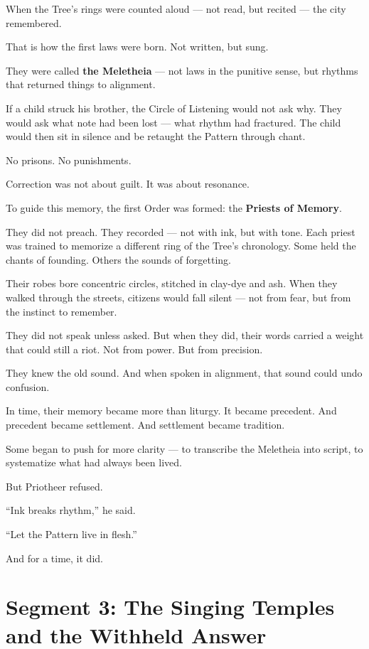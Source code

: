 \documentclass[10pt]{article}
\begin{document}
When the Tree’s rings were counted aloud — not read, but recited —  
the city remembered.

That is how the first laws were born.  
Not written, but sung.

They were called \textbf{the Meletheia} — not laws in the punitive sense,  
but rhythms that returned things to alignment.

If a child struck his brother, the Circle of Listening would not ask why.  
They would ask what note had been lost — what rhythm had fractured.  
The child would then sit in silence and be retaught the Pattern through chant.

No prisons.  
No punishments.

Correction was not about guilt.  
It was about resonance.

To guide this memory, the first Order was formed:  
the \textbf{Priests of Memory}.

They did not preach.  
They recorded — not with ink, but with tone.  
Each priest was trained to memorize a different ring of the Tree’s chronology.  
Some held the chants of founding.  
Others the sounds of forgetting.

Their robes bore concentric circles, stitched in clay-dye and ash.  
When they walked through the streets, citizens would fall silent —  
not from fear,  
but from the instinct to remember.

They did not speak unless asked.  
But when they did, their words carried a weight that could still a riot.  
Not from power.  
But from precision.

They knew the old sound.  
And when spoken in alignment, that sound could undo confusion.

In time, their memory became more than liturgy.  
It became precedent.  
And precedent became settlement.  
And settlement became tradition.

Some began to push for more clarity —  
to transcribe the Meletheia into script,  
to systematize what had always been lived.

But Priotheer refused.

“Ink breaks rhythm,” he said.

“Let the Pattern live in flesh.”

And for a time, it did.

\newpage

\section*{Segment 3: The Singing Temples and the Withheld Answer}
\end{document}
